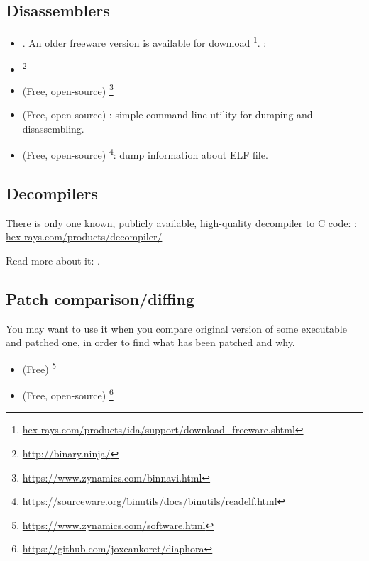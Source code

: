 \subsection{Disassemblers}


\begin{itemize}
\item {}. An older freeware version is available for download
\footnote{\href{http://go.yurichev.com/17031}{hex-rays.com/products/ida/support/download\_freeware.shtml}}.
\ShortHotKeyCheatsheet: 

\item {}\footnote{\url{http://binary.ninja/}}

\item (Free, open-source) \footnote{\url{https://www.zynamics.com/binnavi.html}}

\item (Free, open-source) : simple command-line utility for dumping and disassembling.

\item (Free, open-source) \footnote{\url{https://sourceware.org/binutils/docs/binutils/readelf.html}}:
dump information about ELF file.
\end{itemize}

\subsection{Decompilers}

There is only one known, publicly available, high-quality decompiler to C code: :\\
\href{http://go.yurichev.com/17033}{hex-rays.com/products/decompiler/}

Read more about it: .

\subsection{Patch comparison/diffing}

You may want to use it when you compare original version of some executable and patched one, in order to find
what has been patched and why.

\begin{itemize}
\item (Free) \footnote{\url{https://www.zynamics.com/software.html}}

\item (Free, open-source) \footnote{\url{https://github.com/joxeankoret/diaphora}}
\end{itemize}


